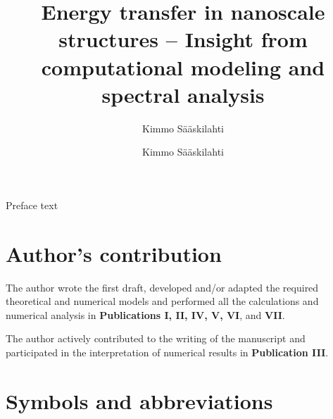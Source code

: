 \documentclass[dissertation,draft*]{aaltoseries}
\author{Kimmo S\"a\"askilahti}
\title{Energy transfer in nanoscale structures -- Insight from computational modeling and spectral analysis}
\newcommand{\listofsymbols}{%
  \chapter*{Symbols and abbreviations}%
}
\begin{document}






\author{Kimmo S\"a\"askilahti}
\begin{preface}
Preface text
\end{preface}

\tableofcontents

\listofpublications

\chapter*{Author's contribution}
The author wrote the first draft, developed and/or adapted the required theoretical and numerical models and performed all the calculations and numerical analysis in \textbf{Publications I, II, IV, V, VI}, and \textbf{VII}.
\vspace{1cm}

\hspace{-3mm}The author actively contributed to the writing of the manuscript and participated in the interpretation of numerical results in \textbf{Publication III}.


\listofsymbols

\end{document}
